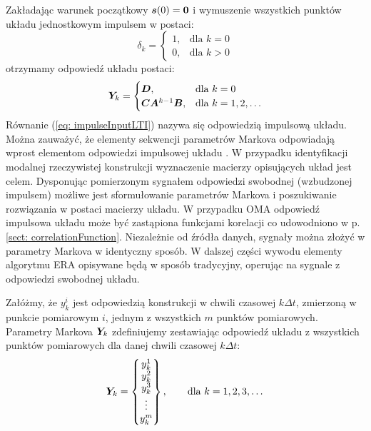 Zakładając warunek początkowy $\bm{s}(0)=\bm{0}$ i wymuszenie wszystkich punktów układu jednostkowym impulsem w postaci:
\begin{equation}
	\delta_k = \begin{cases}
		1, & \text{dla }k=0 \\
		0, & \text{dla } k>0 
	\end{cases}
\end{equation}
otrzymamy odpowiedź układu postaci:
\begin{equation} \label{eq: impulseInputLTI}
	\bm{Y}_k= \begin{cases}
		\bm{D}, & \text{dla }k=0 \\
		\bm{C}\bm{A}^{k-1}\bm{B}, & \text{dla }k=1,2, \dots
	\end{cases}
\end{equation}
Równanie (\ref{eq: impulseInputLTI}) nazywa się odpowiedzią impulsową układu. Można zauważyć, że elementy sekwencji parametrów Markova odpowiadają wprost elementom odpowiedzi impulsowej układu \parencite{Phan1991}.
W przypadku identyfikacji modalnej rzeczywistej konstrukcji wyznaczenie macierzy opisujących układ jest celem. Dysponując pomierzonym sygnałem odpowiedzi swobodnej (wzbudzonej impulsem) możliwe jest sformułowanie parametrów Markova i poszukiwanie rozwiązania w postaci macierzy układu. W przypadku OMA odpowiedź impulsowa układu może być zastąpiona funkcjami korelacji co udowodniono w p. \ref{sect: correlationFunction}.
Niezależnie od źródła danych, sygnały można złożyć w parametry Markova w identyczny sposób. W dalszej części wywodu elementy algorytmu ERA opisywane będą w sposób tradycyjny, operując na sygnale z odpowiedzi swobodnej układu. 

Załóżmy, że $y_k^i$ jest odpowiedzią konstrukcji w chwili czasowej $k\Delta t$, zmierzoną w punkcie pomiarowym $i$, jednym z wszystkich $m$ punktów pomiarowych. Parametry Markova $\bm{Y}_k$ zdefiniujemy zestawiając odpowiedź układu z wszystkich punktów pomiarowych dla danej chwili czasowej $k\Delta t$:
\begin{equation}
	\bm{Y}_k = \begin{Bmatrix}
		y_k^1 \\ y_k^2 \\ y_k^3 \\ \vdots \\ y_k^m 
	\end{Bmatrix},
	\qquad \text{dla } k=1,2,3,\dots
\end{equation}
